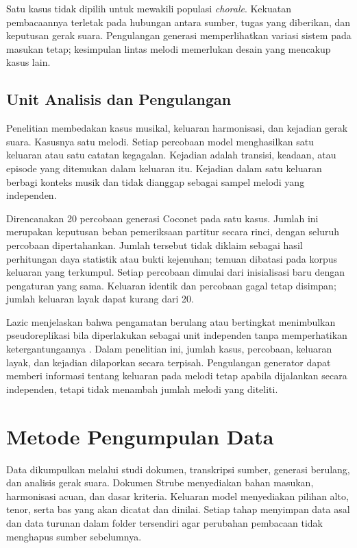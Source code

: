 Satu kasus tidak dipilih untuk mewakili populasi \textit{chorale}. Kekuatan pembacaannya terletak pada hubungan antara sumber, tugas yang diberikan, dan keputusan gerak suara. Pengulangan generasi memperlihatkan variasi sistem pada masukan tetap; kesimpulan lintas melodi memerlukan desain yang mencakup kasus lain.

\subsection{Unit Analisis dan Pengulangan}\label{sec:sampel}

Penelitian membedakan kasus musikal, keluaran harmonisasi, dan kejadian gerak suara. Kasusnya satu melodi. Setiap percobaan model menghasilkan satu keluaran atau satu catatan kegagalan. Kejadian adalah transisi, keadaan, atau episode yang ditemukan dalam keluaran itu. Kejadian dalam satu keluaran berbagi konteks musik dan tidak dianggap sebagai sampel melodi yang independen.

Direncanakan 20 percobaan generasi Coconet pada satu kasus. Jumlah ini merupakan keputusan beban pemeriksaan partitur secara rinci, dengan seluruh percobaan dipertahankan. Jumlah tersebut tidak diklaim sebagai hasil perhitungan daya statistik atau bukti kejenuhan; temuan dibatasi pada korpus keluaran yang terkumpul. Setiap percobaan dimulai dari inisialisasi baru dengan pengaturan yang sama. Keluaran identik dan percobaan gagal tetap disimpan; jumlah keluaran layak dapat kurang dari 20.

Lazic menjelaskan bahwa pengamatan berulang atau bertingkat menimbulkan pseudoreplikasi bila diperlakukan sebagai unit independen tanpa memperhatikan ketergantungannya \parencite{lazic2010}. Dalam penelitian ini, jumlah kasus, percobaan, keluaran layak, dan kejadian dilaporkan secara terpisah. Pengulangan generator dapat memberi informasi tentang keluaran pada melodi tetap apabila dijalankan secara independen, tetapi tidak menambah jumlah melodi yang diteliti.

\section{Metode Pengumpulan Data}\label{sec:metode-pengumpulan-data}

Data dikumpulkan melalui studi dokumen, transkripsi sumber, generasi berulang, dan analisis gerak suara. Dokumen Strube menyediakan bahan masukan, harmonisasi acuan, dan dasar kriteria. Keluaran model menyediakan pilihan alto, tenor, serta bas yang akan dicatat dan dinilai. Setiap tahap menyimpan data asal dan data turunan dalam folder tersendiri agar perubahan pembacaan tidak menghapus sumber sebelumnya.


